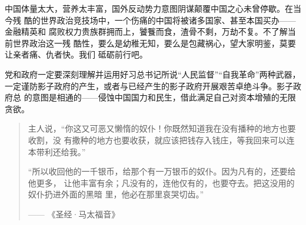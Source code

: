 中国体量太大，营养太丰富，国外反动势力意图阴谋颠覆中国之心未曾停歇。在当今残
酷的世界政治竞技场中，一个伤痛的中国将被诸多国家、甚至本国买办——金融精英和
腐败权力贵族群拥而上，饕餮而食，渣骨不剩，万劫不复。不了解当前世界政治这一残
酷性，要么是幼稚无知，要么是包藏祸心，望大家明鉴，莫要让亲者痛、仇者快。我们
砥砺前行吧。

党和政府一定要深刻理解并运用好习总书记所说“人民监督”“自我革命”两种武器，
一定谨防影子政府的产生，或者与已经产生的影子政府开展艰苦卓绝斗争。影子政府总
的意图是相通的——侵蚀中国国力和民生，借此满足自己对资本增殖的无限贪欲。


\begin{quotation}
  主人说，“你这又可恶又懒惰的奴仆！你既然知道我在没有播种的地方也要收割，没
  有撒种的地方也要收获，就应该把钱存入钱庄，等我回来可以连本带利还给我。”

  “所以收回他的一千银币，给那个有一万银币的奴仆。因为凡有的，还要给他更多，
  让他丰富有余；凡没有的，连他仅有的，也要夺去。把这没用的奴仆扔进外面的黑暗
  里，他必在那里哀哭切齿。”

  \raggedleft
  —— \quad《圣经·马太福音》 \qquad
\end{quotation}















